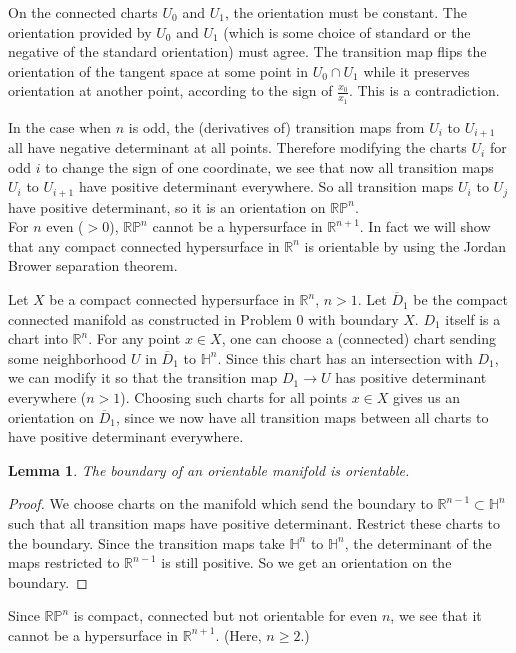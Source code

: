 \documentclass{amsart}
\numberwithin{equation}{section}
\theoremstyle{plain}
\newtheorem{lemma}[theorem]{Lemma}
\theoremstyle{definition}
\theoremstyle{remark}
\renewcommand{\_}[2]{\underbrace{#1}_{#2}}
\renewcommand{\^}[2]{\overbrace{#1}_{#2}}
\newcommand{\R}{\mathbb{R}}
\renewcommand{\P}{\mathbb{P}}
\renewcommand{\H}{\mathbb{H}}
\begin{document}
On the connected charts $U_0$ and $U_1$, the orientation must be constant. The orientation provided by $U_0$ and $U_1$ (which is some choice of standard or the negative of the standard orientation) must agree. The transition map flips the orientation of the tangent space at some point in $U_0\cap U_1$ while it preserves orientation at another point, according to the sign of $\frac{x_0}{x_1}$. This is a contradiction.

In the case when $n$ is odd, the (derivatives of) transition maps from $U_i$ to $U_{i+1}$ all have negative determinant at all points. Therefore modifying the charts $U_i$ for odd $i$ to change the sign of one coordinate, we see that now all transition maps $U_i$ to $U_{i+1}$ have positive determinant everywhere. So all transition maps $U_i$ to $U_j$ have positive determinant, so it is an orientation on $\R\P^n$. \\

For $n$ even ($>0$), $\R\P^n$ cannot be a hypersurface in $\R^{n+1}$. In fact we will show that any compact connected hypersurface in $\R^{n}$ is orientable by using the Jordan Brower separation theorem.

Let $X$ be a compact connected hypersurface in $\R^n$, $n>1$. Let $\overline D_1$ be the compact connected manifold as constructed in Problem 0 with boundary $X$. $D_1$ itself is a chart into $\R^n$. For any point $x \in X$, one can choose a (connected) chart sending some neighborhood $U$ in $\overline D_1$ to $\H^n$. Since this chart has an intersection with $D_1$, we can modify it so that the transition map $D_1 \to U$ has positive determinant everywhere ($n>1$). Choosing such charts for all points $x\in X$ gives us an orientation on $\overline D_1$, since we now have all transition maps between all charts to have positive determinant everywhere.

\begin{lemma}
  The boundary of an orientable manifold is orientable.
\end{lemma}
\begin{proof}
  We choose charts on the manifold which send the boundary to $\R^{n-1}\subset \H^n$ such that all transition maps have positive determinant. Restrict these charts to the boundary. Since the transition maps take $\H^n$ to $\H^n$, the determinant of the maps restricted to $\R^{n-1}$ is still positive. So we get an orientation on the boundary.
\end{proof}

Since $\R\P^n$ is compact, connected but not orientable for even $n$, we see that it cannot be a hypersurface in $\R^{n+1}$. (Here, $n\geq 2$.)
\end{document}
